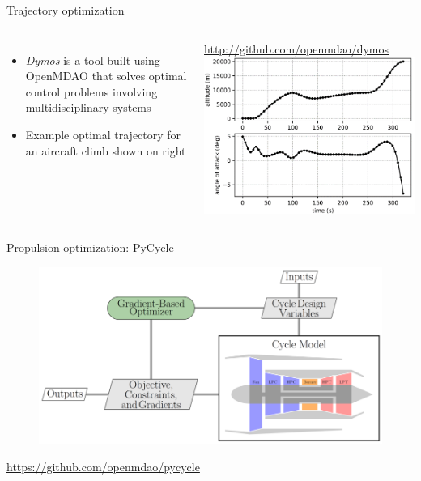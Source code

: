 \documentclass[aspectratio=169, usenames,dvipsnames, 14pt]{beamer}
\begin{document}
\begin{frame}{Trajectory optimization}
	\begin{columns}
			\begin{itemize}
				\item \textit{Dymos} is a tool built using OpenMDAO that solves optimal control problems involving multidisciplinary systems
				\item Example optimal trajectory for an aircraft climb shown on right
			\end{itemize}
			\url{http://github.com/openmdao/dymos}
			\includegraphics[scale=.4]{images/slide_132}
	\end{columns}
\end{frame}
			
\begin{frame}{Propulsion optimization: PyCycle}
	\begin{figure}
		\includegraphics[scale=.4]{images/slide_133.png}
	\end{figure}
	\url{https://github.com/openmdao/pycycle}
\end{frame}
\end{document}
